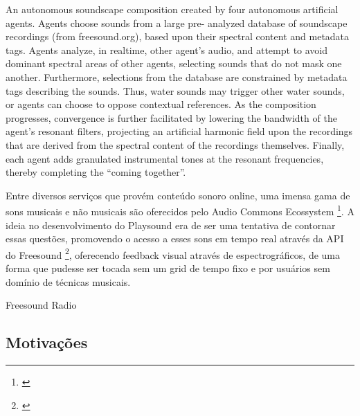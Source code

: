 \begin{citacao}
An autonomous soundscape composition created by four autonomous artificial agents. Agents choose sounds from a large pre- analyzed database of soundscape recordings (from freesound.org), based upon their spectral content and metadata tags. Agents analyze, in realtime, other agent's audio, and attempt to avoid dominant spectral areas of other agents, selecting sounds that do not mask one another. Furthermore, selections from the database are constrained by metadata tags describing the sounds. Thus, water sounds may trigger other water sounds, or agents can choose to oppose contextual references. As the composition progresses, convergence is further facilitated by lowering the bandwidth of the agent's resonant filters, projecting an artificial harmonic field upon the recordings that are derived from the spectral content of the recordings themselves. Finally, each agent adds granulated instrumental tones at the resonant frequencies, thereby completing the ``coming together''. \cite{Arneeigenfeldt2010}
\end{citacao}

Entre diversos serviços que provém conteúdo sonoro online, uma imensa gama de sons musicais e não musicais são oferecidos pelo Audio Commons Ecossystem \footnote{\cite{Font2015}}. A ideia no desenvolvimento do Playsound era de ser uma tentativa de contornar essas questões, promovendo o acesso a esses sons em tempo real através da API do Freesound \footnote{\cite{Akkermans2011}}, oferecendo feedback visual através de espectrográficos, de uma forma que pudesse ser tocada sem um grid de tempo fixo e por usuários sem domínio de técnicas musicais.





Freesound Radio




\subsection{Motivações}

